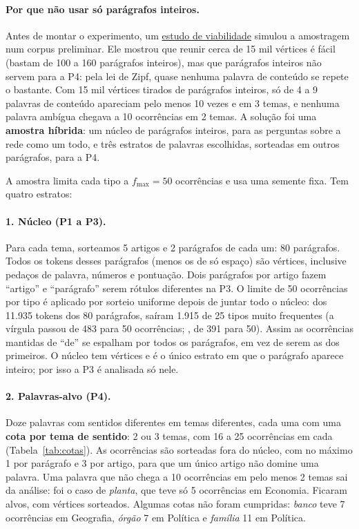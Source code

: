 \paragraph{Por que não usar só parágrafos inteiros.} Antes de montar o experimento, um
\href{\viabilidade}{estudo de viabilidade} simulou a amostragem num corpus preliminar. Ele
mostrou que reunir cerca de 15 mil vértices é fácil (bastam de 100 a 160 parágrafos
inteiros), mas que parágrafos inteiros não servem para a P4: pela lei de Zipf, quase nenhuma
palavra de conteúdo se repete o bastante. Com 15 mil vértices tirados de parágrafos inteiros,
só de 4 a 9 palavras de conteúdo apareciam pelo menos 10 vezes e em 3 temas, e nenhuma palavra
ambígua chegava a 10 ocorrências em 2 temas. A solução foi uma \textbf{amostra híbrida}: um
núcleo de parágrafos inteiros, para as perguntas sobre a rede como um todo, e três estratos de
palavras escolhidas, sorteadas em outros parágrafos, para a P4.

A amostra limita cada tipo a $f_{\max}=50$ ocorrências e usa uma semente fixa. Tem quatro
estratos:

\paragraph{1. Núcleo (P1 a P3).} Para cada tema, sorteamos 5 artigos e 2 parágrafos de cada
um: 80 parágrafos. Todos os tokens desses parágrafos (menos os de só espaço) são vértices,
inclusive pedaços de palavra, números e pontuação. Dois parágrafos por artigo fazem ``artigo''
e ``parágrafo'' serem rótulos diferentes na P3. O limite de 50 ocorrências por tipo é
aplicado por sorteio uniforme depois de juntar todo o núcleo: dos 11.935 tokens dos 80
parágrafos, saíram 1.915 de 25 tipos muito frequentes (a vírgula passou de 483 para 50
ocorrências; , de 391 para 50). Assim as ocorrências mantidas de ``de'' se
espalham por todos os parágrafos, em vez de serem as dos primeiros. O núcleo tem
\nVerticesNucleo{} vértices e é o único estrato em que o parágrafo aparece inteiro; por isso a
P3 é analisada só nele.

\paragraph{2. Palavras-alvo (P4).} Doze palavras com sentidos diferentes em temas diferentes,
cada uma com uma \textbf{cota por tema de sentido}: 2 ou 3 temas, com 16 a 25 ocorrências em
cada (Tabela~\ref{tab:cotas}). As ocorrências são sorteadas fora do núcleo, com no máximo 1 por
parágrafo e 3 por artigo, para que um único artigo não domine uma palavra. Uma palavra que não
chega a 10 ocorrências em pelo menos 2 temas sai da análise: foi o caso de \emph{planta}, que
teve só 5 ocorrências em Economia. Ficaram \nAlvosMantidos{} alvos, com \nVerticesAlvo{}
vértices sorteados. Algumas cotas não foram cumpridas: \emph{banco} teve 7 ocorrências em
Geografia, \emph{órgão} 7 em Política e \emph{família} 11 em Política.

